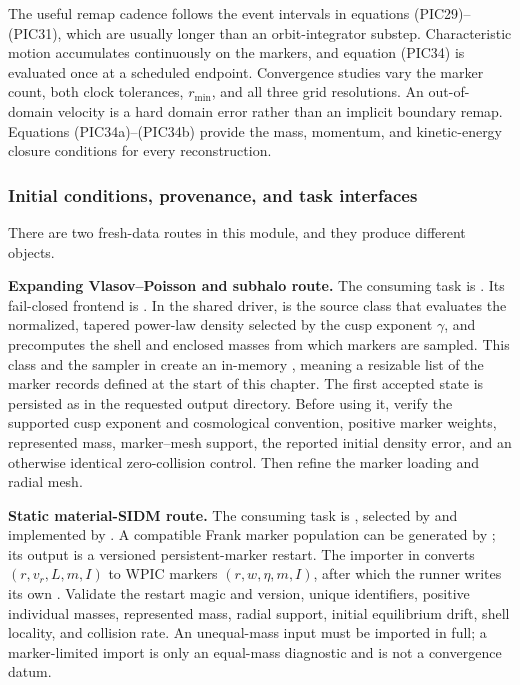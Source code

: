 The useful remap cadence follows the event intervals in equations
(PIC29)--(PIC31), which are usually longer than an orbit-integrator substep.
Characteristic motion accumulates continuously on the markers, and equation
(PIC34) is evaluated once at a scheduled endpoint.  Convergence studies vary
the marker count, both clock tolerances, \(r_{\min}\), and all three grid
resolutions.
An out-of-domain velocity is a hard domain error rather than an implicit
boundary remap.  Equations (PIC34a)--(PIC34b) provide the mass, momentum, and
kinetic-energy closure conditions for every reconstruction.

\subsubsection{Initial conditions, provenance, and task interfaces}

There are two fresh-data routes in this module, and they produce different
objects.

\noindent\textbf{Expanding Vlasov--Poisson and subhalo route.}
The consuming task is .  Its fail-closed frontend
is .  In the shared driver,
 is the source class that evaluates the
normalized, tapered power-law density selected by the cusp exponent
\(\gamma\), and precomputes the shell and enclosed masses from which markers
are sampled.  This class and the  sampler in
 create an in-memory
, meaning a resizable list of the marker
records defined at the start of this chapter.  The first accepted state is
persisted as  in the requested output directory.
Before using it, verify the supported cusp exponent and cosmological
convention, positive marker weights, represented mass, marker--mesh support,
the reported initial density error, and an otherwise identical zero-collision
control.  Then refine the marker loading and radial mesh.

\noindent\textbf{Static material-SIDM route.}
The consuming task is , selected by
 and implemented by
.  A compatible Frank marker population can
be generated by
; its output is a
versioned  persistent-marker restart.  The importer
 in
 converts
\((r,v_r,L,m,I)\) to WPIC markers \((r,w,\eta,m,I)\), after which the runner
writes its own .  Validate the restart magic and
version, unique identifiers, positive individual masses, represented mass,
radial support, initial equilibrium drift, shell locality, and collision rate.
An unequal-mass input must be imported in full; a marker-limited import is only
an equal-mass diagnostic and is not a convergence datum.

